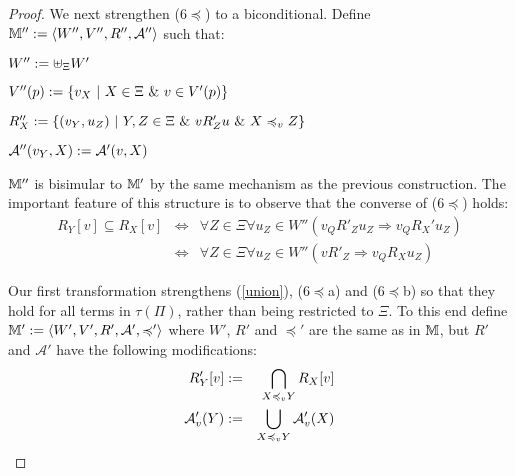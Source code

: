 \begin{proof}
  We next strengthen (6$\preccurlyeq$) to a biconditional.  Define
  $\mathbbm{M}'' \assign \langle W'', V'', R'', \mathcal{A}'' \rangle$ such
  that:
  \begin{itemizedot}
    \item $W'' \assign \uplus_{\Xi} W'$
    
    \item $V'' (p) \assign \{v_X \  | \  X \in \Xi
    \  \& \  v \in V' (p)\}$
    
    \item $R''_X \assign \{(v_Y, u_Z) \  | \  Y, Z \in \Xi
    \  \& \  v R'_Z u \  \& \  X
    \preccurlyeq_v Z\}$
    
    \item $\mathcal{A}'' (v_Y, X) \assign \mathcal{A}' (v, X)$
  \end{itemizedot}
  $\mathbbm{M}''$ is bisimular to $\mathbbm{M}'$ by the same mechanism as the
  previous construction.  The important feature of this structure is to
  observe that the converse of (6$\preccurlyeq$) holds:
  \begin{eqnarray*}
    R_Y [v] \subseteq R_X [v] & \Longleftrightarrow & \forall Z \in \Xi
    \forall u_Z \in W'' (v_Q R'_Z u_Z \Longrightarrow v_Q R_X' u_Z)\\
    & \Longleftrightarrow & \forall Z \in \Xi \forall u_Z \in W'' (v R'_Z
    \Longrightarrow v_Q R_X u_Z)
  \end{eqnarray*}
  
  
  Our first transformation strengthens (\ref{union}), (6$\preccurlyeq$a) and
  (6$\preccurlyeq$b) so that they hold for all terms in $\tau (\Pi)$, rather
  than being restricted to $\Xi$.  To this end define $\mathbbm{M}' \assign
  \langle W', V', R', \mathcal{A}', \preccurlyeq' \rangle$ where $W'$, $R'$
  and $\preccurlyeq'$ are the same as in $\mathbbm{M}$, but $R'$ and
  $\mathcal{A}'$ have the following modifications:
  \begin{eqnarray}
    R'_Y [v] & \assign & \bigcap_{X \preccurlyeq_v Y} R_X [v] \nonumber\\
    \mathcal{A}'_v (Y) & \assign & \bigcup_{X \preccurlyeq_v Y} \mathcal{A}'_v
    (X) \nonumber
  \end{eqnarray}
  \end{proof}
